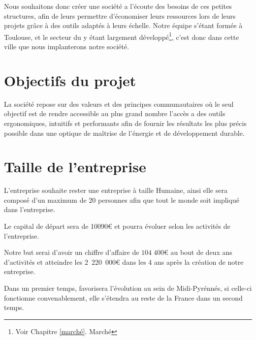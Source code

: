 		Nous souhaitons donc créer une société a l'écoute des besoins de ces petites structures, afin de leurs permettre d'économiser leurs ressources lors de leurs projets grâce à des outils adaptés à leurs échelle.
		Notre équipe s'étant formée à Toulouse, et le secteur du \gHabitat{} y étant largement développé\footnote{Voir Chapitre \ref{marché}. Marché}, c'est donc dans cette ville que nous implanterons notre société.

	\section{Objectifs du projet}
		La société \K{} repose sur des valeurs et des principes communautaires
		où le seul objectif est de rendre accessible au plus grand nombre
		l'accès a des outils ergonomiques, intuitifs et performants
		afin de fournir les résultats les plus précis possible 
		dans une optique de maîtrise de l'énergie et de développement durable.

	\section{Taille de l'entreprise}
	L'entreprise \K{} souhaite rester une entreprise à taille Humaine, ainsi elle sera composé d'un maximum de 20 personnes afin que tout le monde soit impliqué dans l'entreprise.

	Le capital de départ sera de 10090\euro{} et pourra évoluer selon les activités de l'entreprise. 

	Notre but serai d'avoir un chiffre d'affaire de $104\;400$\euro{} au bout de deux ans d'activités et atteindre les 2~220~000\euro{} dans les 4 ans après la création de notre entreprise. 

	Dans un premier temps, \K{} favorisera l'évolution au sein de Midi-Pyrénnés, si celle-ci fonctionne
	convenablement, elle s'étendra au reste de la France dans un second temps.
